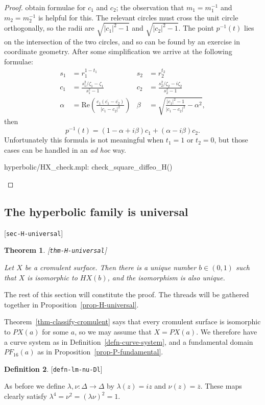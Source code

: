 \documentclass[reqno]{amsart}
\newcommand{\lbl}[1]{\label{#1}\textup{[\texttt{#1}]}\par}
\newcommand{\lbl}{\label}
\newcommand{\Dl}        {\Delta}
\newcommand{\al}        {\alpha}
\newcommand{\bt}        {\beta}
\newcommand{\zt}        {\zeta}
\newcommand{\lm}        {\lambda}
\newcommand{\ov}[1]     {\overline{#1}}
\renewcommand{\:}{\colon}
\newtheorem{theorem}{Theorem}[subsection]
\theoremstyle{definition}
\newtheorem{definition}[theorem]{Definition}
\begin{document}
\begin{proof}
 obtain formulae for $c_1$ and $c_2$; the observation that
 $m_1=m_1^{-1}$ and $m_2=m_2^{-1}$ is helpful for this.  The relevant
 circles must cross the unit circle orthogonally, so the radii are
 $\sqrt{|c_1|^2-1}$ and $\sqrt{|c_2|^2-1}$.  The point $p^{-1}(t)$
 lies on the intersection of the two circles, and so can be found by
 an exercise in coordinate geometry.  After some simplification we
 arrive at the following formulae:
 \begin{align*}
  s_1 &= r_1^{1-t_1} &
  s_2 &= r_2^{t_2} \\
  c_1 &= \frac{s_1^2/\zt_1-\zt_1}{s_1^2-1} &
  c_2 &= \frac{s_2^2/\zt_2-i\zt_2}{s_2^2-1} \\
  \al &= \text{Re}\left(\frac{c_1(\ov{c_1}-\ov{c_2})}{|c_1-c_2|^2}\right) &
  \bt &= \sqrt{\frac{|c_1|^2-1}{|c_1-c_2|^2}-\al^2},
 \end{align*}
 then
 \[ p^{-1}(t) = (1-\al+i\bt)c_1 + (\al-i\bt)c_2. \]
 Unfortunately this formula is not meaningful when $t_1=1$ or $t_2=0$,
 but those cases can be handled in an \emph{ad hoc} way.
 \begin{checks}
  hyperbolic/HX_check.mpl: check_square_diffeo_H()
 \end{checks}
\end{proof}

\subsection{The hyperbolic family is universal}
\lbl{sec-H-universal}

\begin{theorem}\lbl{thm-H-universal}
 Let $X$ be a cromulent surface.  Then there is a unique number
 $b\in(0,1)$ such that $X$ is isomorphic to $HX(b)$, and the
 isomorphism is also unique.
\end{theorem}

The rest of this section will constitute the proof.  The threads will
be gathered together in Proposition~\ref{prop-H-universal}.

Theorem~\ref{thm-classify-cromulent} says that every cromulent surface
is isomorphic to $PX(a)$ for some $a$, so we may assume that
$X=PX(a)$.  We therefore have a curve system as in
Definition~\ref{defn-curve-system}, and a fundamental domain
$PF_{16}(a)$ as in Proposition~\ref{prop-P-fundamental}.

\begin{definition}\lbl{defn-lm-nu-Dl}
 As before we define $\lm,\nu\:\Dl\to\Dl$ by $\lm(z)=iz$ and
 $\nu(z)=\ov{z}$.  These maps clearly satisfy
 $\lm^4=\nu^2=(\lm\nu)^2=1$.
\end{definition}
\end{document}
